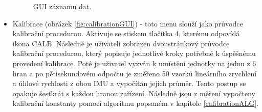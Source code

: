 \begin{itemize}
\begin{figure}[h]
        \caption{GUI záznamu dat.}
        \label{fig:recordGUI}
\end{figure}

\item Kalibrace (obrázek \ref{fig:calibrationGUI}) - toto menu slouží jako průvodce kalibrační procedurou. Aktivuje se stiskem tlačítka 4, kterému odpovídá ikona CALB. Následně je uživateli zobrazen dvoustránkový průvodce kalibrační procedurou, který popisuje jednotlivé kroky potřebné k úspěšnému provedení kalibrace. Poté je uživatel vyzván k umístění jednotky na jednu z 6 hran a po pětisekundovém odpočtu je změřeno 50 vzorků lineárního zrychlení a úhlové rychlosti z obou IMU a vypočítán jejich průměr. Tento postup se opakuje šestkrát s každou hranou zařízení. Následně jsou z měření vypočteny kalibrační konstanty pomocí algoritmu popsaném v kapitole \ref{calibrationALG}.
\end{itemize}
